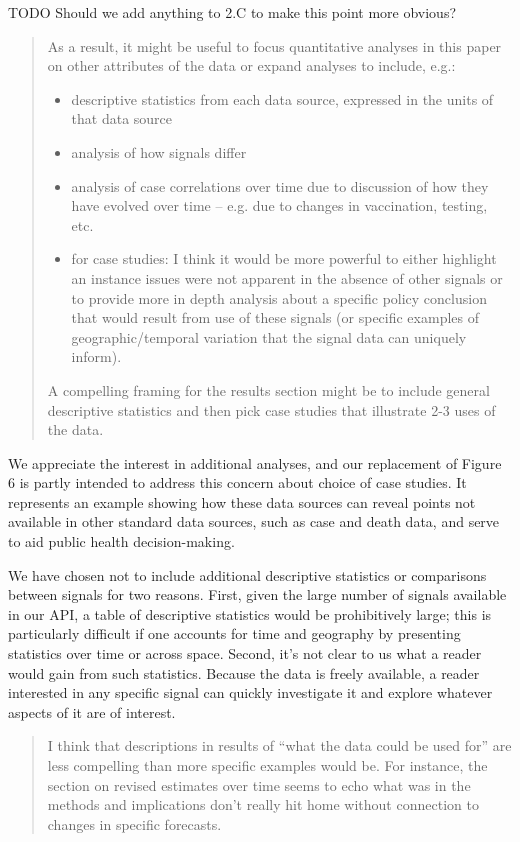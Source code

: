 \documentclass[11pt]{article}
\begin{document}
TODO Should we add anything to 2.C to make this point more obvious?

\begin{quote}
  As a result, it might be useful to focus quantitative analyses in this paper
  on other attributes of the data or expand analyses to include, e.g.:
  \begin{itemize}
  \item descriptive statistics from each data source, expressed in the units of
    that data source
  \item analysis of how signals differ
  \item analysis of case correlations over time due to discussion of how they
    have evolved over time -- e.g. due to changes in vaccination, testing, etc.
  \item for case studies: I think it would be more powerful to either highlight
    an instance issues were not apparent in the absence of other signals or to
    provide more in depth analysis about a specific policy conclusion that would
    result from use of these signals (or specific examples of
    geographic/temporal variation that the signal data can uniquely inform).
  \end{itemize}
  A compelling framing for the results section might be to include general
  descriptive statistics and then pick case studies that illustrate 2-3 uses of
  the data.
\end{quote}

We appreciate the interest in additional analyses, and our replacement of Figure
6 is partly intended to address this concern about choice of case studies. It
represents an example showing how these data sources can reveal points not
available in other standard data sources, such as case and death data, and serve
to aid public health decision-making.

We have chosen not to include additional descriptive statistics or comparisons
between signals for two reasons. First, given the large number of signals
available in our API, a table of descriptive statistics would be prohibitively
large; this is particularly difficult if one accounts for time and geography by
presenting statistics over time or across space. Second, it's not clear to us
what a reader would gain from such statistics. Because the data is freely
available, a reader interested in any specific signal can quickly investigate it
and explore whatever aspects of it are of interest.

\begin{quote}
  I think that descriptions in results of ``what the data could be used for''
  are less compelling than more specific examples would be. For instance, the
  section on revised estimates over time seems to echo what was in the methods
  and implications don't really hit home without connection to changes in
  specific forecasts.
\end{quote}
\end{document}

